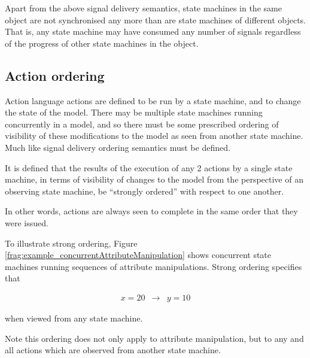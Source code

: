 Apart from the above signal delivery semantics, state machines in the same
object are not synchronised any more than are state machines of different
objects. That is, any state machine may have consumed any number of signals
regardless of the progress of other state machines in the object.




\subsection{Action ordering}
Action language actions are defined to be run by a state machine, and to
change the state of the model. There may be multiple state machines running
concurrently in a model, and so there must be some prescribed ordering of
visibility of these modifications to the model as seen from another state
machine. Much like signal delivery ordering semantics must be defined.

It is defined that the results of the execution of any 2 actions by a single
state machine, in terms of visibility of changes to the model from the
perspective of an observing state machine, be ``strongly ordered'' with
respect to one another.

In other words, actions are always seen to complete in the same order that
they were issued.

To illustrate strong ordering, Figure
\ref{frag:example_concurrentAttributeManipulation} shows concurrent state
machines running sequences of attribute manipulations.  Strong ordering
specifies that 

\begin{eqnarray*}x = 20 & \rightarrow & y = 10\end{eqnarray*}

when viewed from any state machine.

Note this ordering does not only apply to attribute manipulation, but to any and
all actions which are observed from another state machine.

